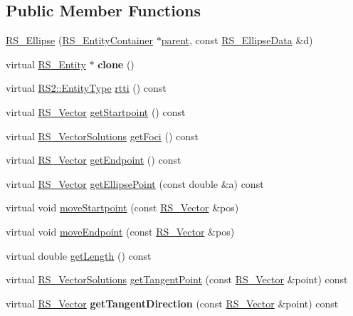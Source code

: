 \subsection*{Public Member Functions}
\begin{DoxyCompactItemize}
\item 
\hyperlink{classRS__Ellipse_a3e74f3a304ab2960fcf71f1698cf39ff}{R\-S\-\_\-\-Ellipse} (\hyperlink{classRS__EntityContainer}{R\-S\-\_\-\-Entity\-Container} $\ast$\hyperlink{classRS__Entity_a80358a8d2fc6739a516a278dc500b49f}{parent}, const \hyperlink{classRS__EllipseData}{R\-S\-\_\-\-Ellipse\-Data} \&d)
\item 
\hypertarget{classRS__Ellipse_ad690a645f653b3ee711c06634cbc40e1}{virtual \hyperlink{classRS__Entity}{R\-S\-\_\-\-Entity} $\ast$ {\bfseries clone} ()}\label{classRS__Ellipse_ad690a645f653b3ee711c06634cbc40e1}

\item 
virtual \hyperlink{classRS2_a8f26d1b981e1e85cff16738b43337e6a}{R\-S2\-::\-Entity\-Type} \hyperlink{classRS__Ellipse_acffbf75de7227ff1336bad7b48c329b2}{rtti} () const 
\item 
virtual \hyperlink{classRS__Vector}{R\-S\-\_\-\-Vector} \hyperlink{classRS__Ellipse_a094960cd14c0cc7a341517a1417a5671}{get\-Startpoint} () const 
\item 
virtual \hyperlink{classRS__VectorSolutions}{R\-S\-\_\-\-Vector\-Solutions} \hyperlink{classRS__Ellipse_ad594222368190b315cb14be4d38c3cc6}{get\-Foci} () const 
\item 
virtual \hyperlink{classRS__Vector}{R\-S\-\_\-\-Vector} \hyperlink{classRS__Ellipse_a044205913e3af376ab4754246e42f257}{get\-Endpoint} () const 
\item 
virtual \hyperlink{classRS__Vector}{R\-S\-\_\-\-Vector} \hyperlink{classRS__Ellipse_afd7a9368b55bb44abd545a14b2b7fb3d}{get\-Ellipse\-Point} (const double \&a) const 
\item 
virtual void \hyperlink{classRS__Ellipse_a0fe4b0d647e20f97b4ece7a52eda3aa6}{move\-Startpoint} (const \hyperlink{classRS__Vector}{R\-S\-\_\-\-Vector} \&pos)
\item 
virtual void \hyperlink{classRS__Ellipse_adb3b389777fff8d898d6b6c803fbd505}{move\-Endpoint} (const \hyperlink{classRS__Vector}{R\-S\-\_\-\-Vector} \&pos)
\item 
virtual double \hyperlink{classRS__Ellipse_a24518e9bce849c70bbfc0aec73b23068}{get\-Length} () const 
\item 
virtual \hyperlink{classRS__VectorSolutions}{R\-S\-\_\-\-Vector\-Solutions} \hyperlink{classRS__Ellipse_a14bb39d2a2689758d93a218a70810a59}{get\-Tangent\-Point} (const \hyperlink{classRS__Vector}{R\-S\-\_\-\-Vector} \&point) const 
\item 
\hypertarget{classRS__Ellipse_afca2b5d5e0d7bbb1e9874820ace4add4}{virtual \hyperlink{classRS__Vector}{R\-S\-\_\-\-Vector} {\bfseries get\-Tangent\-Direction} (const \hyperlink{classRS__Vector}{R\-S\-\_\-\-Vector} \&point) const }\label{classRS__Ellipse_afca2b5d5e0d7bbb1e9874820ace4add4}


\end{DoxyCompactItemize}
